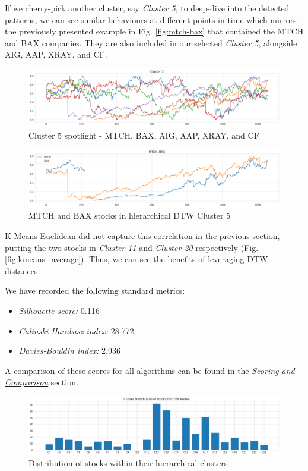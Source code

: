 \documentclass[11pt]{article}
\begin{document}
If we cherry-pick another cluster, say \textit{Cluster 5}, to deep-dive into the detected patterns, we can see similar behaviours at different points in time which mirrors the previously presented example in Fig. \ref{fig:mtch-bax} that  contained the MTCH and BAX companies. They are also included in our selected \textit{Cluster 5}, alongside AIG, AAP, XRAY, and CF.

\begin{figure}[H]
\centering
\includegraphics[width=12cm]{img/kernel-cluster5.png} 
\caption{Cluster 5 spotlight - MTCH, BAX, AIG, AAP, XRAY, and CF}
\label{fig:kernel-cluster5}
\end{figure}

\begin{figure}[H] 
\centering
\includegraphics[width=12cm]{img/mtch-bax.png} 
\caption{MTCH and BAX stocks in hierarchical DTW Cluster 5}
\end{figure}

K-Means Euclidean did not capture this correlation in the previous section, putting the two stocks in \textit{Cluster 11} and \textit{Cluster 20} respectively (Fig. \ref{fig:kmeans_average}). Thus, we can see the benefits of leveraging DTW distances.

We have recorded the following standard metrics:
\begin{itemize}
    \item \textit{Silhouette score:} 0.116
    \item \textit{Calinski-Harabasz index:} 28.772
    \item \textit{Davies-Bouldin index:} 2.936
\end{itemize}

A comparison of these scores for all algorithms can be found in the \textit{\hyperref[sec:compare]{Scoring and Comparison}} section.


\begin{figure}[H]
\centering
\includegraphics[width=12cm]{img/kernel-dtw-stock-distrib.png} 
\caption{Distribution of stocks within their hierarchical clusters}
\label{fig:kmeans_dtw_dist}
\end{figure}
\end{document}
